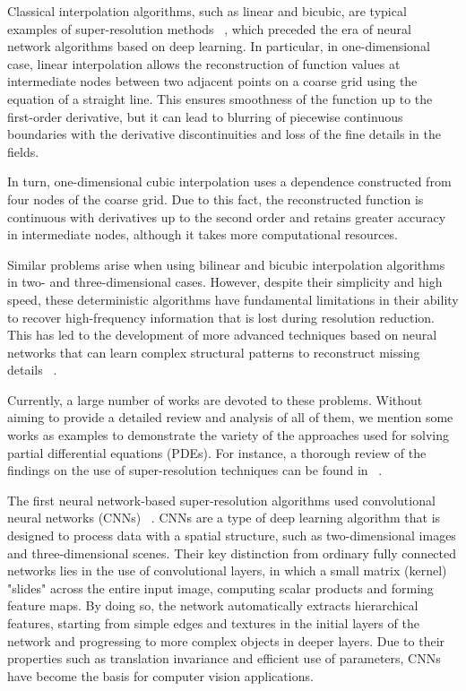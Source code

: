 \documentclass{ieeeaccess}
\begin{document}
Classical interpolation algorithms, such as linear and bicubic, are typical examples of super-resolution methods ~\cite{Getreur_LI}, which preceded the era of neural network algorithms based on deep learning. In particular, in one-dimensional case, linear interpolation allows the reconstruction of function values at intermediate nodes between two adjacent points on a coarse grid using the equation of a straight line. This ensures smoothness of the function up to the first-order derivative, but it can lead to blurring of piecewise continuous boundaries with the derivative discontinuities and loss of the fine details in the fields.

In turn, one-dimensional cubic interpolation uses a dependence constructed from four nodes of the coarse grid. Due to this fact, the reconstructed function is continuous with derivatives up to the second order and retains greater accuracy in intermediate nodes, although it takes more computational resources.

Similar problems arise when using bilinear and bicubic interpolation algorithms in two- and three-dimensional cases. However, despite their simplicity and high speed, these deterministic algorithms have fundamental limitations in their ability to recover high-frequency information that is lost during resolution reduction. This has led to the development of more advanced techniques based on neural networks that can learn complex structural patterns to reconstruct missing details ~\cite{Weiqin_SR}.

Currently, a large number of works are devoted to these problems. Without aiming to provide a detailed review and analysis of all of them, we mention some works as examples to demonstrate the variety of the approaches used for solving partial differential equations (PDEs). For instance, a thorough review of the findings on the use of super-resolution techniques can be found in ~\cite{Bin_SR_Review}.

The first neural network-based super-resolution algorithms  used convolutional neural networks (CNNs) ~\cite{Dong_SR}. CNNs are a type of deep learning algorithm that is designed to process data with a spatial structure, such as two-dimensional images and three-dimensional scenes. Their key distinction from ordinary fully connected networks lies in the use of convolutional layers, in which a small matrix (kernel) "slides" across the entire input image, computing scalar products and forming feature maps. By doing so, the network automatically extracts hierarchical features, starting from simple edges and textures in the initial layers of the network and progressing to more complex objects in deeper layers. Due to their properties such as translation invariance and efficient use of parameters, CNNs have become the basis for computer vision applications.
\end{document}
